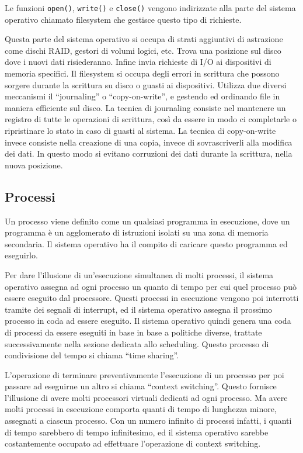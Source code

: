 \documentclass{article}
\numberwithin{equation}{subsection}
\begin{document}
Le funzioni \verb|open()|, \verb|write()| e \verb|close()| vengono indirizzate alla parte del sistema operativo chiamato filesystem che gestisce questo tipo di richieste.  

Questa parte del sistema operativo si occupa di strati aggiuntivi di astrazione come dischi RAID, gestori di volumi logici, etc. Trova una posizione sul disco dove i nuovi 
dati risiederanno. Infine invia richieste di I/O ai dispositivi di memoria specifici. Il filesystem si occupa degli errori in scrittura che possono sorgere durante la 
scrittura su disco o guasti ai dispositivi. Utilizza due diversi meccanismi il ``journaling'' o ``copy-on-write'', e gestendo ed ordinando file in maniera efficiente sul 
disco. 
La tecnica di journaling consiste nel mantenere un registro di tutte le operazioni di scrittura, così da essere in modo ci completarle o ripristinare lo stato in caso 
di guasti al sistema. 
La tecnica di copy-on-write invece consiste nella creazione di una copia, invece di sovrascriverli alla modifica dei dati. In questo modo si evitano corruzioni dei dati 
durante la scrittura, nella nuova posizione. 

\subsection{Processi}

Un processo viene definito come un qualsiasi programma in esecuzione, dove un programma è un agglomerato di istruzioni isolati su una zona di memoria secondaria. Il 
sistema operativo ha il compito di caricare questo programma ed eseguirlo. 

Per dare l'illusione di un'esecuzione simultanea di molti processi, il sistema operativo assegna ad ogni processo un quanto di tempo per cui quel processo può 
essere eseguito dal processore. Questi processi in esecuzione vengono poi interrotti tramite dei segnali di interrupt, ed il sistema operativo assegna il prossimo 
processo in coda ad essere eseguito. Il sistema operativo quindi genera una coda di processi da essere eseguiti in base in base a politiche diverse, trattate successivamente 
nella sezione dedicata allo scheduling. 
Questo processo di condivisione del tempo si chiama ``time sharing''. 

L'operazione di terminare preventivamente l'esecuzione di un processo per poi passare ad eseguirne un altro si chiama ``context switching''. Questo fornisce l'illusione 
di avere molti processori virtuali dedicati ad ogni processo. Ma avere molti processi in esecuzione comporta quanti di tempo di lunghezza minore, assegnati a ciascun 
processo. Con un numero infinito di processi infatti, i quanti di tempo sarebbero di tempo infinitesimo, ed il sistema operativo sarebbe costantemente occupato ad 
effettuare l'operazione di context switching. 
\end{document}
